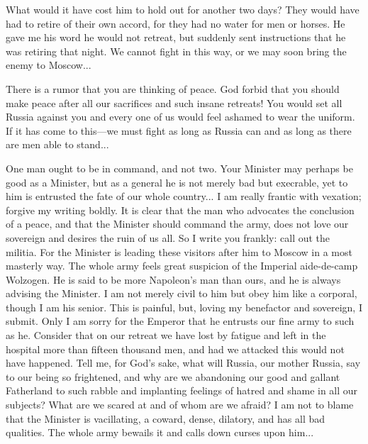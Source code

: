 What would it have cost him to hold out for another two days?
They would have had to retire of their own accord, for they had
no water for men or horses. He gave me his word he would not
retreat, but suddenly sent instructions that he was retiring that
night. We cannot fight in this way, or we may soon bring the
enemy to Moscow...

There is a rumor that you are thinking of peace. God forbid that
you should make peace after all our sacrifices and such insane
retreats! You would set all Russia against you and every one of
us would feel ashamed to wear the uniform. If it has come to
this---we must fight as long as Russia can and as long as there
are men able to stand...

One man ought to be in command, and not two. Your Minister may
perhaps be good as a Minister, but as a general he is not merely
bad but execrable, yet to him is entrusted the fate of our whole
country... I am really frantic with vexation; forgive my writing
boldly. It is clear that the man who advocates the conclusion of
a peace, and that the Minister should command the army, does not
love our sovereign and desires the ruin of us all. So I write you
frankly: call out the militia. For the Minister is leading these
visitors after him to Moscow in a most masterly way. The whole
army feels great suspicion of the Imperial aide-de-camp
Wolzogen. He is said to be more Napoleon's man than ours, and he
is always advising the Minister. I am not merely civil to him but
obey him like a corporal, though I am his senior. This is
painful, but, loving my benefactor and sovereign, I submit. Only
I am sorry for the Emperor that he entrusts our fine army to such
as he.  Consider that on our retreat we have lost by fatigue and
left in the hospital more than fifteen thousand men, and had we
attacked this would not have happened. Tell me, for God's sake,
what will Russia, our mother Russia, say to our being so
frightened, and why are we abandoning our good and gallant
Fatherland to such rabble and implanting feelings of hatred and
shame in all our subjects? What are we scared at and of whom are
we afraid? I am not to blame that the Minister is vacillating, a
coward, dense, dilatory, and has all bad qualities. The whole
army bewails it and calls down curses upon him...


